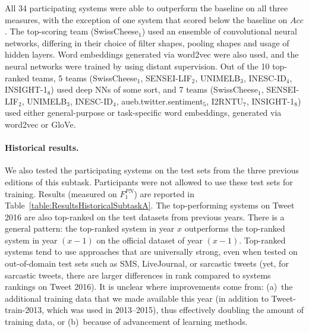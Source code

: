 \documentclass[11pt,letterpaper]{article}
\begin{document}
All 34 participating systems were able to outperform
the baseline on all three measures, with the exception of one system that scored below the baseline on $Acc$. The
top-scoring team (SwissCheese$_{1}$) used an ensemble of convolutional
neural networks, differing in their choice of filter shapes, pooling
shapes and usage of hidden layers. Word embeddings generated via
word2vec were also used, and the neural networks were trained by using
distant supervision. Out of
the 10 top-ranked teams, 5 teams (SwissCheese$_{1}$, SENSEI-LIF$_{2}$,
UNIMELB$_{3}$, INESC-ID$_{4}$, INSIGHT-1$_{8}$) used deep NNs of some
sort, and 7 teams (SwissCheese$_{1}$, SENSEI-LIF$_{2}$, UNIMELB$_{3}$,
INESC-ID$_{4}$, aueb.twitter.sentiment$_{5}$, I2RNTU$_{7}$,
INSIGHT-1$_{8}$) used either general-purpose or task-specific word
embeddings, generated via word2vec or GloVe.

\paragraph{Historical results.} We also tested the participating
systems on the test sets from the three previous editions of this
subtask. Participants were not allowed to use these test sets for
training. Results (measured on $F_1^{PN}$) are
reported in Table~\ref{table:ResultsHistoricalSubtaskA}. The top-performing systems on Tweet 2016 are also top-ranked on
the test datasets from previous years. There is a general
pattern: the top-ranked system in year $x$
outperforms the top-ranked system in year $(x-1)$ on the official
dataset of year $(x-1)$. Top-ranked systems tend to
use approaches that are universally strong, even when tested on
out-of-domain test sets such as SMS, LiveJournal, or sarcastic tweets
(yet, for sarcastic tweets, there are larger differences in rank
compared to systems rankings on Tweet 2016).  It is unclear where
improvements come from: (a)~the additional training data
that we made available this year (in addition to Tweet-train-2013,
which was used in 2013--2015), thus effectively doubling the amount of
training data, or (b)~because of advancement of learning methods.
\end{document}

